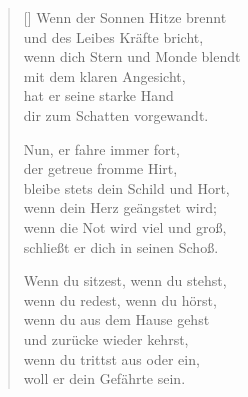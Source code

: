\begin{multicols}{2}
\begin{verse}[\versewidth]
 Wenn der Sonnen Hitze brennt\\
und des Leibes Kräfte bricht,\\
wenn dich Stern und Monde blendt\\
mit dem klaren Angesicht,\\
hat er seine starke Hand\\
dir zum Schatten vorgewandt.

 Nun, er fahre immer fort,\\
der getreue fromme Hirt,\\
bleibe stets dein Schild und Hort,\\
wenn dein Herz geängstet wird;\\
wenn die Not wird viel und groß,\\
schließt er dich in seinen Schoß.

 Wenn du sitzest, wenn du stehst,\\
wenn du redest, wenn du hörst,\\
wenn du aus dem Hause gehst\\
und zurücke wieder kehrst,\\
wenn du trittst aus oder ein,\\
woll er dein Gefährte sein.

\end{verse}
\end{multicols}
